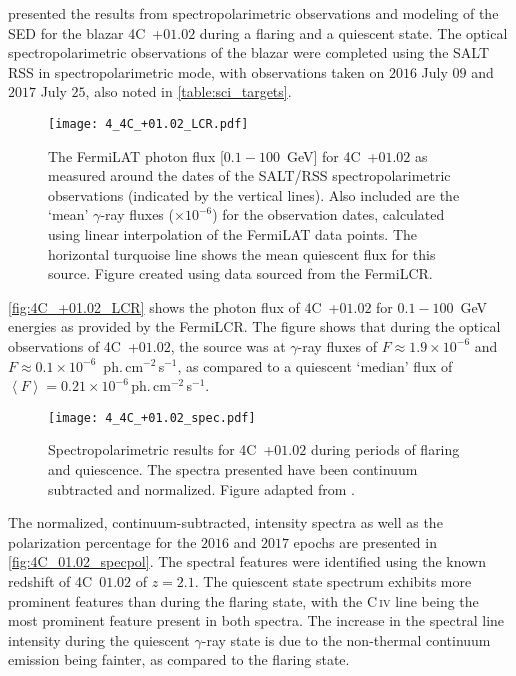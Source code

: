 \citet{Schutte4C0102} presented the results from spectropolarimetric observations and modeling of the \gls{SED} for the blazar 4C~+$01.02$ during a flaring and a quiescent state.
The optical spectropolarimetric observations of the blazar were completed using the \gls{SALT} \gls{RSS} in spectropolarimetric mode, with observations taken on $2016$ July $09$ and $2017$ July $25$, also noted in \autoref{table:sci_targets}.

\begin{figure}[t]
    \centering
    \texttt{[image: 4\_4C\_+01.02\_LCR.pdf]}
    \caption{The \gls{FermiLAT} photon flux [$0.1 - 100$~GeV] for 4C~+$01.02$ as measured around the dates of the \gls{SALT}/\gls{RSS} spectropolarimetric observations (indicated by the vertical lines). Also included are the `mean' $\gamma$-ray fluxes ($\times 10^{-6}$) for the observation dates, calculated using linear interpolation of the \gls{FermiLAT} data points. The horizontal turquoise line shows the mean quiescent flux for this source. Figure created using data sourced from the \gls{FermiLCR}.\protect\footnotemark}
    \label{fig:4C_+01.02_LCR}
\end{figure}

\autoref{fig:4C_+01.02_LCR} shows the photon flux of 4C~+$01.02$ for $0.1 - 100$~GeV energies as provided by the \gls{FermiLCR}.
The figure shows that during the optical observations of 4C~+$01.02$, the source was at $\gamma$-ray fluxes of $F \approx 1.9 \times 10^{-6}$ and $F \approx 0.1 \times 10^{-6}$~ph.\,cm$^{-2}$\,s$^{-1}$, as compared to a quiescent `median' flux of $\left\langle F \right\rangle = 0.21 \times 10^{-6}$\,ph.\,cm$^{-2}$\,s$^{-1}$.

\begin{figure}[t]
    \centering
    \texttt{[image: 4\_4C\_+01.02\_spec.pdf]}
    \caption{Spectropolarimetric results for 4C~+$01.02$ during periods of flaring and quiescence. The spectra presented have been continuum subtracted and normalized. Figure adapted from \citep{Schutte4C0102}.}
    \label{fig:4C_01.02_specpol}
\end{figure}


The normalized, continuum-subtracted, intensity spectra as well as the polarization percentage for the $2016$ and $2017$ epochs are presented in \autoref{fig:4C_01.02_specpol}.
The spectral features were identified using the known redshift of 4C~$01.02$ of $z = 2.1$.
The quiescent state spectrum exhibits more prominent features than during the flaring state, with the C\,\textsc{iv} line being the most prominent feature present in both spectra.
The increase in the spectral line intensity during the quiescent $\gamma$-ray state is due to the non-thermal continuum emission being fainter, as compared to the flaring state.

